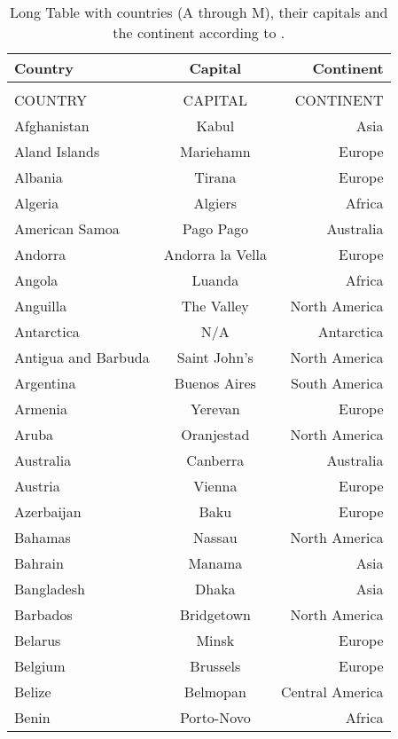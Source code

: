\begin{longtable}{l|c|r}
\endfirsthead 
\hline
Country & Capital & Continent\\\hline
\endhead
\caption{Long Table with countries (A through M), their capitals and the continent according to \cite{cite-techslides_2013}.  \label{tab:longCountry}} \\
\hline
COUNTRY         & CAPITAL           & CONTINENT \\ \hline
Afghanistan     & Kabul             & Asia\\
Aland Islands   & Mariehamn         & Europe\\
Albania         & Tirana            & Europe\\
Algeria         & Algiers           & Africa\\
American Samoa  & Pago Pago         & Australia\\
Andorra         & Andorra la Vella  & Europe\\
Angola          & Luanda            & Africa\\
Anguilla        & The Valley        & North America\\
Antarctica      & N/A               & Antarctica\\
Antigua and Barbuda & Saint John’s  & North America\\
Argentina       & Buenos Aires      & South America\\
Armenia	        & Yerevan           & Europe\\
Aruba           & Oranjestad        & North America\\
Australia       & Canberra          & Australia\\
Austria         & Vienna            & Europe\\
Azerbaijan      & Baku              & Europe\\
Bahamas         & Nassau            & North America\\
Bahrain         & Manama            & Asia\\
Bangladesh      & Dhaka             & Asia\\
Barbados        & Bridgetown        & North America\\
Belarus         & Minsk             & Europe\\
Belgium         & Brussels          & Europe\\
Belize          & Belmopan          & Central America\\
Benin           & Porto-Novo        & Africa\\

\end{longtable}
